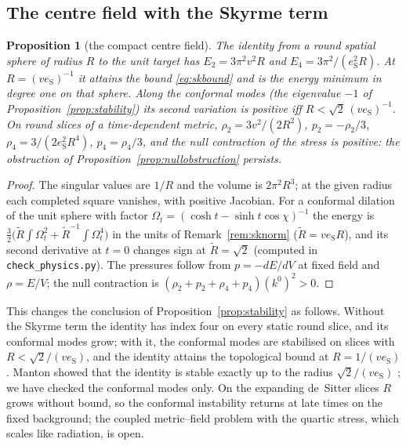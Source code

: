 \documentclass[aps,pra,onecolumn,superscriptaddress,nofootinbib,10pt]{revtex4-2}
\newtheorem{proposition}[theorem]{Proposition}
\theoremstyle{definition}
\theoremstyle{remark}
\begin{document}
\subsection{The centre field with the Skyrme term}

\begin{proposition}[the compact centre field]\label{prop:skcentre}
The identity from a round spatial sphere of radius $R$ to the unit target has $E_2=3\pi^2v^2R$ and
$E_4=3\pi^2/(e_{\mathrm S}^2R)$.  At $R=(ve_{\mathrm S})^{-1}$ it attains the bound \eqref{eq:skbound} and is the energy minimum in degree one on
that sphere.  Along the conformal modes (the eigenvalue $-1$ of Proposition~\ref{prop:stability}) its second variation
is positive iff $R<\sqrt2\,(ve_{\mathrm S})^{-1}$.  On round slices of a time-dependent metric, $\rho_2=3v^2/(2R^2)$, $p_2=-\rho_2/3$,
$\rho_4=3/(2e_{\mathrm S}^2R^4)$, $p_4=\rho_4/3$, and the null contraction of the stress is positive: the obstruction of
Proposition~\ref{prop:nullobstruction} persists.
\end{proposition}
\begin{proof}
The singular values are $1/R$ and the volume is $2\pi^2R^3$; at the given radius each completed square vanishes,
with positive Jacobian.  For a conformal dilation of the unit sphere with factor
$\Omega_t=(\cosh t-\sinh t\cos\chi)^{-1}$ the energy is $\tfrac32\bigl(\tilde R\int\Omega_t^2+\tilde R^{-1}\int\Omega_t^4\bigr)$ in the units of
Remark~\ref{rem:sknorm} ($\tilde R=ve_{\mathrm S}R$), and its second derivative at $t=0$ changes sign at $\tilde R=\sqrt2$ (computed in
\texttt{check\_physics.py}).  The pressures follow from $p=-dE/dV$ at fixed field and $\rho=E/V$; the null contraction
is $(\rho_2+p_2+\rho_4+p_4)(k^0)^2>0$.
\end{proof}
\noindent This changes the conclusion of Proposition~\ref{prop:stability} as follows.  Without the Skyrme term the
identity has index four on every static round slice, and its conformal modes grow; with it, the conformal
modes are stabilised on slices with $R<\sqrt2/(ve_{\mathrm S})$, and the identity attains the topological bound at
$R=1/(ve_{\mathrm S})$.  Manton showed that the identity is stable exactly up to the radius $\sqrt2/(ve_{\mathrm S})$ \cite{Manton87};
we have checked the conformal modes only.  On the expanding de~Sitter slices $R$ grows without bound, so
the conformal instability returns at late times on the fixed background; the coupled metric--field
problem with the quartic stress, which scales like radiation, is open.
\end{document}
